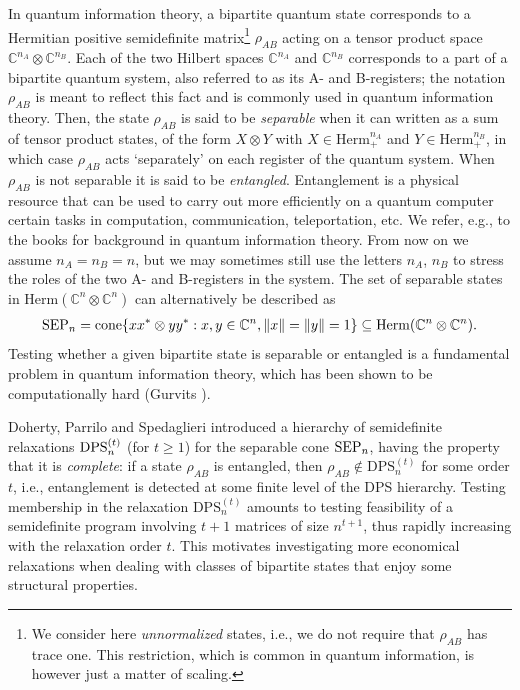 \documentclass[11pt]{article}
\newcommand{\C}{\ensuremath{\mathbb{C}}} %
\newcommand{\Herm}{\mathrm{Herm}}
\newcommand{\Cnn}{\C^n\ot \C^n}
\newcommand{\SEP}{\text{\rm SEP}}
\newcommand{\DPS}{\text{\rm DPS}}
\newcommand{\DPSt}{\mathrm{DPS}^{(t)}}
\newcommand{\cone}{\text{\rm cone}}
\newcommand{\ot}{\otimes}
\theoremstyle{plain}
\begin{document}
In quantum information theory, a  bipartite quantum state corresponds to a Hermitian positive semidefinite matrix\footnote{We consider here {\em unnormalized} states, i.e., we do not require that $\rho_{AB}$ has trace one. This restriction, which is  common  in quantum information, is however just a matter of scaling.}  $\rho_{AB}$ acting on a tensor product space $\C^{n_A}\ot\C^{n_B}$.
Each of the two Hilbert spaces $\C^{n_A}$ and $\C^{n_B}$ corresponds to a part  of a bipartite quantum system, also referred to as its A- and B-registers;
 the notation $\rho_{AB}$ is meant to reflect this fact and is commonly used  in quantum information theory.
 Then, the state $\rho_{AB}$ is said to be  {\em separable} when it can written as a sum of tensor product states, of the form $X\ot Y$ with $X\in \Herm^{n_A}_+$ and $Y\in \Herm^{n_B}_+$, in which case $\rho_{AB}$ acts `separately' on each register of the quantum system. When $\rho_{AB}$ is not separable it is said to be {\em entangled}. Entanglement is a physical resource that can be used to carry out more efficiently on a quantum computer certain tasks in computation, communication, teleportation, etc. We refer, e.g., to the books \cite{Nielsen_Chuang,Watrous} for background in quantum information theory.  From now on we assume  $n_A=n_B=n$, but we may sometimes still use the letters $n_A$, $n_B$ to stress the roles of the two A- and B-registers in the system.
 The set of separable states in $\Herm(\Cnn)$ 
 can  alternatively be described as
\begin{align}\label{eq:SEP}
\begin{split}
\SEP_n 
= \cone\{ xx^*\ot yy^*: x,y\in\C^n, \|x\|=\|y\|=1\}\subseteq \Herm(\Cnn). 
\end{split}
\end{align}
Testing whether a given bipartite state is separable or entangled is a fundamental problem in quantum information theory, which has been shown to be  computationally hard  (Gurvits \cite{Gurvits}).  

Doherty, Parrilo and Spedaglieri \cite{DPS_2002,DPS_2004} introduced a hierarchy of semidefinite relaxations $\DPS_n^{(t)}$ (for $t\ge 1$) for the separable cone $\SEP_n$, having the property that it is {\em complete}: 
if a state $\rho_{AB}$ is entangled, then $\rho_{AB}\not\in\DPSt_n$ for some order $t$, i.e., entanglement is detected at some finite level of the DPS hierarchy. Testing membership in the relaxation $\DPSt_n$ amounts to testing feasibility of a  semidefinite program involving $t+1$ matrices of size  $n^{t+1}$, thus rapidly  increasing  with the relaxation order $t$. This  motivates investigating more economical relaxations when dealing with classes of bipartite states that enjoy some  structural properties.
\end{document}
